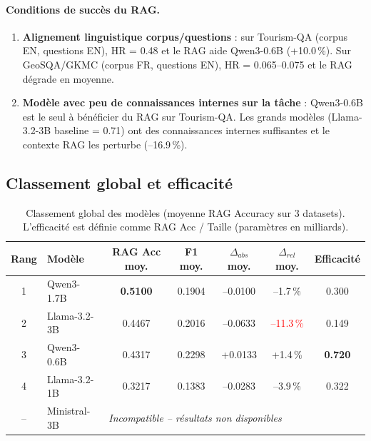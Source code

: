 \documentclass[12pt,a4paper]{article}
\begin{document}
\paragraph{Conditions de succ\`es du RAG.}
\begin{enumerate}[leftmargin=*]
  \item \textbf{Alignement linguistique corpus/questions} : sur Tourism-QA (corpus EN,
  questions EN), HR = 0.48 et le RAG aide Qwen3-0.6B (+10.0\,\%). Sur GeoSQA/GKMC
  (corpus FR, questions EN), HR = 0.065--0.075 et le RAG d\'egrade en moyenne.
  \item \textbf{Mod\`ele avec peu de connaissances internes sur la t\^ache} : Qwen3-0.6B
  est le seul \`a b\'en\'eficier du RAG sur Tourism-QA. Les grands mod\`eles
  (Llama-3.2-3B baseline = 0.71) ont des connaissances internes suffisantes et le
  contexte RAG les perturbe (--16.9\,\%).
\end{enumerate}

\subsection{Classement global et efficacit\'e}

\begin{table}[H]
\centering
\caption{Classement global des mod\`eles (moyenne RAG Accuracy sur 3 datasets).
  L'efficacit\'e est d\'efinie comme RAG Acc / Taille (param\`etres en milliards).}
\label{tab:classement_global}
\begin{tabular}{@{} c l c c c c c @{}}
\toprule
\textbf{Rang} & \textbf{Mod\`ele} & \textbf{RAG Acc moy.}
  & \textbf{F1 moy.} & \textbf{$\Delta_{abs}$ moy.}
  & \textbf{$\Delta_{rel}$ moy.} & \textbf{Efficacit\'e} \\
\midrule
1 & Qwen3-1.7B   & \textbf{0.5100} & 0.1904
  & --0.0100 & --1.7\,\% & 0.300 \\
\rowcolor{lightgray}
2 & Llama-3.2-3B & 0.4467 & 0.2016
  & --0.0633 & \textcolor{red}{--11.3\,\%} & 0.149 \\
3 & Qwen3-0.6B   & 0.4317 & 0.2298
  & +0.0133 & \textcolor{green!60!black}{+1.4\,\%} & \textbf{0.720} \\
\rowcolor{lightgray}
4 & Llama-3.2-1B & 0.3217 & 0.1383
  & --0.0283 & --3.9\,\% & 0.322 \\
\midrule
-- & Ministral-3B & \multicolumn{5}{l}{\textit{Incompatible -- r\'esultats non disponibles}} \\
\bottomrule
\end{tabular}
\end{table}
\end{document}
